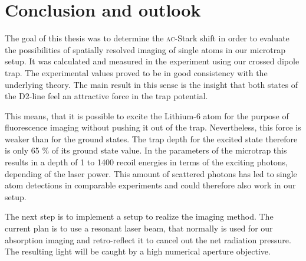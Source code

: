 \chapter{Conclusion and outlook}

The goal of this thesis was to determine the \textsc{ac}-Stark shift in order to evaluate the possibilities of spatially resolved imaging of single atoms in our microtrap setup. It was calculated and measured in the experiment using our crossed dipole trap. The experimental values proved to be in good consistency with the underlying theory. The main result in this sense is the insight that both states of the D2-line feel an attractive force in the trap potential. 

This means, that it is possible to excite the Lithium-6 atom for the purpose of fluorescence imaging without pushing it out of the trap. Nevertheless, this force is weaker than for the ground states. The trap depth for the excited state therefore is only 65 \% of its ground state value. In the parameters of the microtrap this results in a depth of 1 to 1400 recoil energies in terms of the exciting photons, depending of the laser power. This amount of scattered photons has led to single atom detections in comparable experiments \cite{schmiedmayer} and could therefore also work in our setup.

The next step is to implement a setup to realize the imaging method. The current plan is to use a resonant laser beam, that normally is used for our absorption imaging and retro-reflect it to cancel out the net radiation pressure. The resulting light will be caught by a high numerical aperture objective.


%
